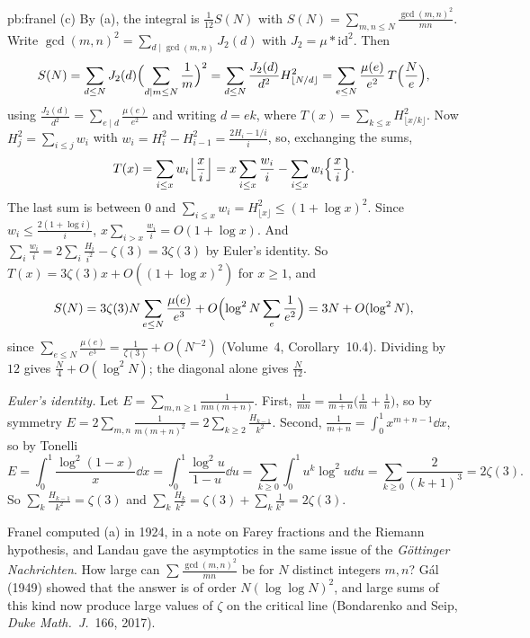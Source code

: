 \begin{solution}{pb:franel}
(c) By (a), the integral is $\frac1{12}S(N)$ with $S(N)=\sum_{m,n\le N}\frac{\gcd(m,n)^2}{mn}$. Write $\gcd(m,n)^2=\sum_{d\mid\gcd(m,n)}J_2(d)$ with $J_2=\mu*\mathrm{id}^2$. Then
\[
S(N)=\sum_{d\le N}J_2(d)\Bigl(\sum_{d\mid m\le N}\frac1m\Bigr)^2=\sum_{d\le N}\frac{J_2(d)}{d^2}H_{\lfloor N/d\rfloor}^2=\sum_{e\le N}\frac{\mu(e)}{e^2}\,T\Bigl(\frac Ne\Bigr),
\]
using $\frac{J_2(d)}{d^2}=\sum_{e\mid d}\frac{\mu(e)}{e^2}$ and writing $d=ek$, where $T(x)=\sum_{k\le x}H_{\lfloor x/k\rfloor}^2$. Now $H_j^2=\sum_{i\le j}w_i$ with $w_i=H_i^2-H_{i-1}^2=\frac{2H_i-1/i}i$,
so, exchanging the sums,
\[
T(x)=\sum_{i\le x}w_i\Bigl\lfloor\frac xi\Bigr\rfloor=x\sum_{i\le x}\frac{w_i}i-\sum_{i\le x}w_i\Bigl\{\frac xi\Bigr\}.
\]
The last sum is between $0$ and $\sum_{i\le x}w_i=H_{\lfloor x\rfloor}^2\le(1+\log x)^2$. Since $w_i\le\frac{2(1+\log i)}i$, $x\sum_{i>x}\frac{w_i}i=O(1+\log x)$. And
$\sum_i\frac{w_i}i=2\sum_i\frac{H_i}{i^2}-\zeta(3)=3\zeta(3)$ by Euler's identity. So $T(x)=3\zeta(3)x+O((1+\log x)^2)$ for $x\ge1$, and
\[
S(N)=3\zeta(3)N\sum_{e\le N}\frac{\mu(e)}{e^3}+O\Bigl(\log^2N\sum_e\frac1{e^2}\Bigr)=3N+O(\log^2N),
\]
since $\sum_{e\le N}\frac{\mu(e)}{e^3}=\frac1{\zeta(3)}+O(N^{-2})$ (Volume~4, Corollary~10.4). Dividing by $12$ gives $\frac N4+O(\log^2N)$; the diagonal alone gives $\frac N{12}$.

\emph{Euler's identity.} Let $E=\sum_{m,n\ge1}\frac1{mn(m+n)}$. First, $\frac1{mn}=\frac1{m+n}\bigl(\frac1m+\frac1n\bigr)$, so by symmetry
$E=2\sum_{m,n}\frac1{m(m+n)^2}=2\sum_{k\ge2}\frac{H_{k-1}}{k^2}$. Second, $\frac1{m+n}=\int_0^1x^{m+n-1}\dd x$, so by Tonelli
\[
E=\int_0^1\frac{\log^2(1-x)}x\dd x=\int_0^1\frac{\log^2u}{1-u}\dd u=\sum_{k\ge0}\int_0^1u^k\log^2u\dd u=\sum_{k\ge0}\frac2{(k+1)^3}=2\zeta(3).
\]
So $\sum_k\frac{H_{k-1}}{k^2}=\zeta(3)$ and $\sum_k\frac{H_k}{k^2}=\zeta(3)+\sum_k\frac1{k^3}=2\zeta(3)$.

\leads Franel computed (a) in 1924, in a note on Farey fractions and the Riemann hypothesis, and Landau gave the asymptotics in the same issue of the \emph{Göttinger Nachrichten}. How large
can $\sum\frac{\gcd(m,n)^2}{mn}$ be for $N$ distinct integers $m,n$? Gál (1949) showed that the answer is of order $N(\log\log N)^2$, and large sums of this kind now produce large values of $\zeta$ on the critical line
(Bondarenko and Seip, \emph{Duke Math.\ J.}\ 166, 2017).
\end{solution}

